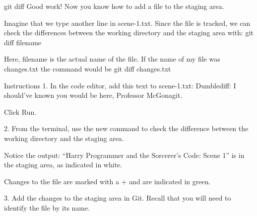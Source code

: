 git diff
    Good work! Now you know how to add a file to the staging area.

    Imagine that we type another line in scene-1.txt. Since the file is tracked, we can check the differences between the working directory and the staging area with:
        git diff filename
    
    Here, filename is the actual name of the file. If the name of my file was changes.txt the command would be
        git diff changes.txt
 
Instructions
    1.
    In the code editor, add this text to scene-1.txt:
        Dumblediff: I should've known you would be here, Professor McGonagit.
    
    Click Run.

    2.
    From the terminal, use the new command to check the difference between the working directory and the staging area.

    Notice the output:
        “Harry Programmer and the Sorcerer’s Code: Scene 1” is in the staging area, as indicated in white.
    
    Changes to the file are marked with a + and are indicated in green.

    3.
    Add the changes to the staging area in Git. Recall that you will need to identify the file by its name.
